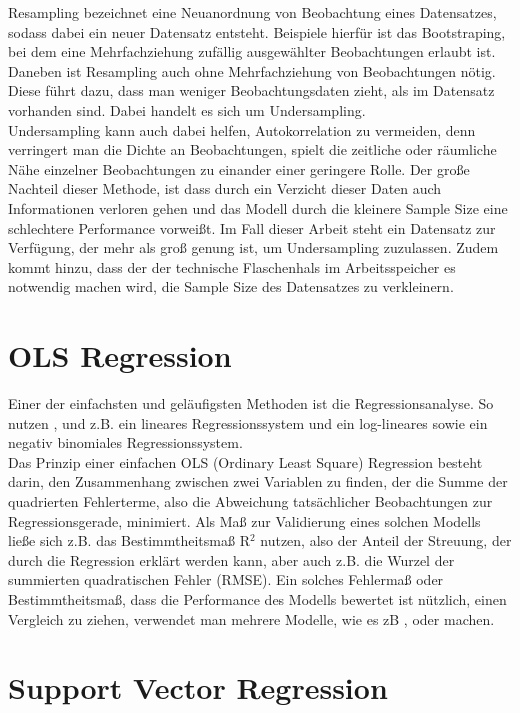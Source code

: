 \documentclass[a4paper,12pt]{thesis}
\begin{document}
Resampling bezeichnet eine Neuanordnung von Beobachtung eines Datensatzes, sodass dabei ein neuer Datensatz entsteht. Beispiele hierfür ist das Bootstraping, bei dem eine Mehrfachziehung zufällig ausgewählter Beobachtungen erlaubt ist. Daneben ist Resampling auch ohne Mehrfachziehung von Beobachtungen nötig. Diese führt dazu, dass man weniger Beobachtungsdaten zieht, als im Datensatz vorhanden sind. Dabei handelt es sich um Undersampling.\\
Undersampling kann auch dabei helfen, Autokorrelation zu vermeiden, denn verringert man die Dichte an Beobachtungen, spielt die zeitliche oder räumliche Nähe einzelner Beobachtungen zu einander einer geringere Rolle. Der große Nachteil dieser Methode, ist dass durch ein Verzicht dieser Daten auch Informationen verloren gehen und das Modell durch die kleinere Sample Size eine schlechtere Performance vorweißt. Im Fall dieser Arbeit steht ein Datensatz zur Verfügung, der mehr als groß genung ist, um Undersampling zuzulassen. Zudem kommt hinzu, dass der der technische Flaschenhals im Arbeitsspeicher es notwendig machen wird, die Sample Size des Datensatzes zu verkleinern.

\section{OLS Regression}

Einer der einfachsten und geläufigsten Methoden ist die Regressionsanalyse. So nutzen \cite{Holmgren2017}, \cite{Alattar2021} und \cite{Gao2022} z.B. ein lineares Regressionssystem und \cite{Wessel2020} ein log-lineares sowie ein negativ binomiales Regressionssystem.\\
Das Prinzip einer einfachen OLS (Ordinary Least Square) Regression besteht darin, den Zusammenhang zwischen zwei Variablen zu finden, der die Summe der quadrierten Fehlerterme, also die Abweichung tatsächlicher Beobachtungen zur Regressionsgerade, minimiert. Als Maß zur Validierung eines solchen Modells ließe sich z.B. das Bestimmtheitsmaß R$^2$ nutzen, also der Anteil der Streuung, der durch die Regression erklärt werden kann, aber auch z.B. die Wurzel der summierten quadratischen Fehler (RMSE). Ein solches Fehlermaß oder Bestimmtheitsmaß, dass die Performance des Modells bewertet ist nützlich, einen Vergleich zu ziehen, verwendet man mehrere Modelle, wie es zB \cite{Holmgren2017}, \cite{Broucke2019} oder \cite{Gao2022} machen.

\section{Support Vector Regression}
\end{document}
